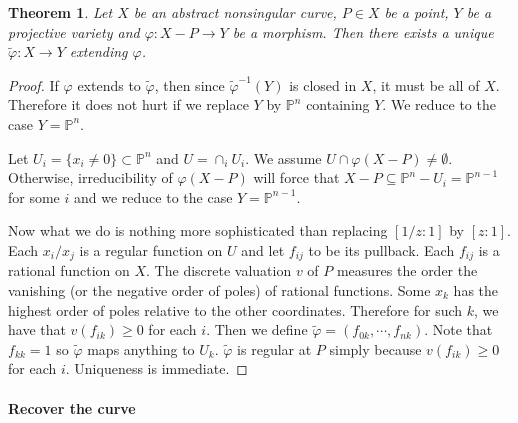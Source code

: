 \documentclass[12pt]{article}
\theoremstyle{plain}
\newtheorem{theorem}[equation]{Theorem}
\theoremstyle{definition}
\theoremstyle{named}
\newcommand{\IP}{\mathbb{P}}
\newcommand{\<}{\langle}
\renewcommand{\>}{\rangle}
\def\wt{\widetilde}
\begin{document}
\begin{theorem}
Let $X$ be an abstract nonsingular curve, $P \in X$ be a point, $Y$ be a projective variety and $\varphi : X - P \to Y$ be a morphism. Then there exists a unique $\wt{\varphi} : X \to Y$ extending $\varphi$. 
\end{theorem}
\begin{proof}
If $\varphi$ extends to $\wt{\varphi}$, then since $\wt{\varphi}^{-1}(Y)$ is closed in $X$, it must be all of $X$. Therefore it does not hurt if we replace $Y$ by $\IP^n$ containing $Y$. We reduce to the case $Y = \IP^n$. 

Let $U_i = \{ x_i \neq 0\} \subset \IP^n$ and $U = \cap_i U_i$. We assume $U \cap \varphi( X - P) \neq \emptyset$. Otherwise, irreducibility of $\varphi(X - P)$ will force that $X - P \subseteq \IP^n - U_i = \IP^{n - 1}$ for some $i$ and we reduce to the case $Y = \IP^{n - 1}$.  

Now what we do is nothing more sophisticated than replacing $[1/z : 1]$ by $[z : 1]$. Each $x_i/x_j$ is a regular function on $U$ and let $f_{ij}$ to be its pullback. Each $f_{ij}$ is a rational function on $X$. The discrete valuation $v$ of $P$ measures the order the vanishing (or the negative order of poles) of rational functions. Some $x_k$ has the highest order of poles relative to the other coordinates. Therefore for such $k$, we have that $v(f_{ik}) \ge 0$ for each $i$. Then we define $\wt{\varphi} = (f_{0k}, \cdots, f_{nk})$. Note that $f_{kk} = 1$ so $\wt{\varphi}$ maps anything to $U_k$. $\wt{\varphi}$ is regular at $P$ simply because $v(f_{ik}) \ge 0$ for each $i$. Uniqueness is immediate. 
\end{proof}

\paragraph{Recover the curve}
\end{document}
